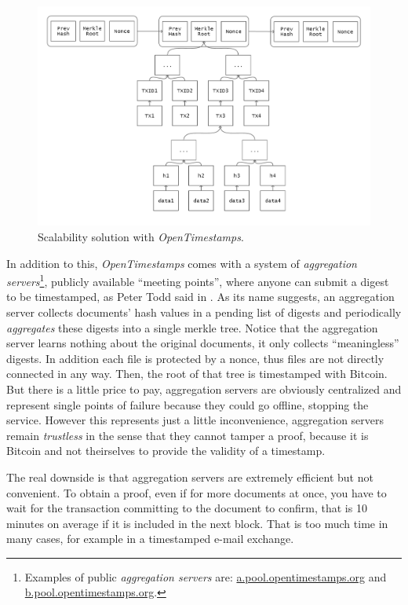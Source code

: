 \begin{figure}[ht]
    \centering
	\includegraphics[width=0.9\linewidth]{Images/bitcoin-chain-calendar.png}
	\caption{Scalability solution with \textit{OpenTimestamps}.}
	\label{fig:scalability}
\end{figure}

\bigskip
\noindent
In addition to this, \textit{OpenTimestamps} comes with a system of \textit{aggregation servers}\textup{\footnote{Examples of public \textit{aggregation servers} are: \url{a.pool.opentimestamps.org} and \url{b.pool.opentimestamps.org}.}}, publicly available \enquote{meeting points}, where anyone can submit a digest to be timestamped, as Peter Todd said in \cite{OTSannouncment}. As its name suggests, an aggregation server collects documents' hash values in a pending list of digests and periodically \textit{aggregates} these digests into a single merkle tree. Notice that the aggregation server learns nothing about the original documents, it only collects \enquote{meaningless} digests. In addition each file is protected by a nonce, thus files are not directly connected in any way. Then, the root of that tree is timestamped with Bitcoin. But there is a little price to pay, aggregation servers are obviously centralized and represent single points of failure because they could go offline, stopping the service. However this represents just a little inconvenience, aggregation servers remain \textit{trustless} in the sense that they cannot tamper a proof, because it is Bitcoin and not theirselves to provide the validity of a timestamp.

\bigskip
\noindent
The real downside is that aggregation servers are extremely efficient but not convenient. To obtain a proof, even if for more documents at once, you have to wait for the transaction committing to the document to confirm, that is 10 minutes on average if it is included in the next block. That is too much time in many cases, for example in a timestamped e-mail exchange.

